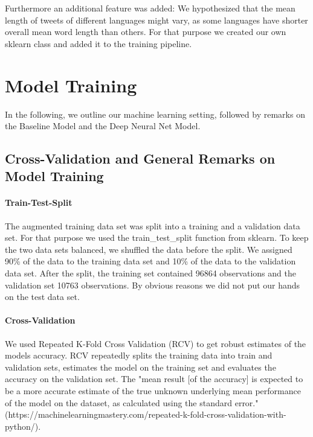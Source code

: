\documentclass[fleqn,10pt]{SelfArx} %
\begin{document}
Furthermore an additional feature was added: We hypothesized that the mean length of tweets of different languages might vary, as some languages have shorter overall mean word length than others. For that purpose we created our own sklearn class and added it to the training pipeline.

\section{Model Training}

In the following, we outline our machine learning setting, followed by remarks on the Baseline Model and the Deep Neural Net Model.

\subsection{Cross-Validation and General Remarks on Model Training}

\paragraph{Train-Test-Split} The augmented training data set was split into a training and a validation data set. For that purpose we used the train\_test\_split function from sklearn. To keep the two data sets balanced, we shuffled the data before the split. We assigned 90\% of the data to the training data set and 10\% of the data to the validation data set. After the split, the training set contained 96864 observations and the validation set 10763 observations. By obvious reasons we did not put our hands on the test data set.

\paragraph{Cross-Validation}
We used Repeated K-Fold Cross Validation (RCV) to get robust estimates of the models accuracy. RCV repeatedly splits the training data into train and validation sets, estimates the model on the training set and evaluates the accuracy on the validation set. The "mean result [of the accuracy] is expected to be a more accurate estimate of the true unknown underlying mean performance of the model on the dataset, as calculated using the standard error." (https://machinelearningmastery.com/repeated-k-fold-cross-validation-with-python/).
\end{document}
